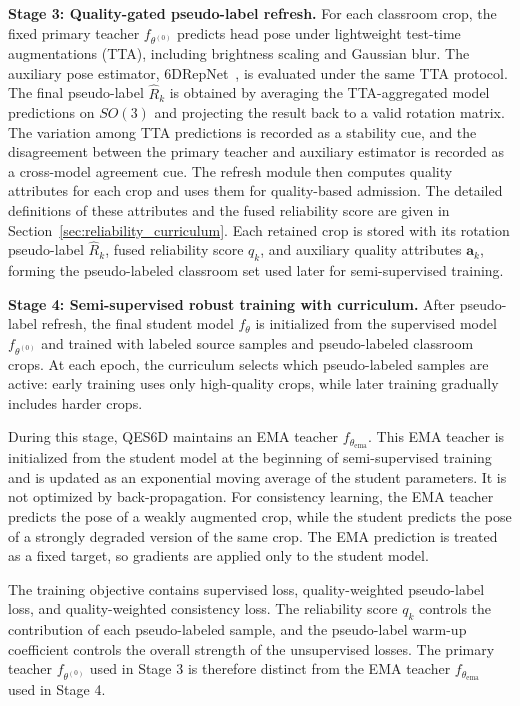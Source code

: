 \documentclass[preprint,12pt]{elsarticle}
\begin{document}
\textbf{Stage 3: Quality-gated pseudo-label refresh.}
For each classroom crop, the fixed primary teacher $f_{\theta^{(0)}}$ predicts head pose under lightweight test-time augmentations (TTA), including brightness scaling and Gaussian blur. The auxiliary pose estimator, 6DRepNet~\cite{hempel2022sixdrepnet}, is evaluated under the same TTA protocol. The final pseudo-label $\hat{R}_k$ is obtained by averaging the TTA-aggregated model predictions on $SO(3)$ and projecting the result back to a valid rotation matrix. The variation among TTA predictions is recorded as a stability cue, and the disagreement between the primary teacher and auxiliary estimator is recorded as a cross-model agreement cue. The refresh module then computes quality attributes for each crop and uses them for quality-based admission. The detailed definitions of these attributes and the fused reliability score are given in Section~\ref{sec:reliability_curriculum}. Each retained crop is stored with its rotation pseudo-label $\hat{R}_k$, fused reliability score $q_k$, and auxiliary quality attributes $\mathbf{a}_k$, forming the pseudo-labeled classroom set used later for semi-supervised training.

\textbf{Stage 4: Semi-supervised robust training with curriculum.}
After pseudo-label refresh, the final student model $f_\theta$ is initialized from the supervised model $f_{\theta^{(0)}}$ and trained with labeled source samples and pseudo-labeled classroom crops. At each epoch, the curriculum selects which pseudo-labeled samples are active: early training uses only high-quality crops, while later training gradually includes harder crops.

During this stage, QES6D maintains an EMA teacher $f_{\theta_{\mathrm{ema}}}$. This EMA teacher is initialized from the student model at the beginning of semi-supervised training and is updated as an exponential moving average of the student parameters. It is not optimized by back-propagation. For consistency learning, the EMA teacher predicts the pose of a weakly augmented crop, while the student predicts the pose of a strongly degraded version of the same crop. The EMA prediction is treated as a fixed target, so gradients are applied only to the student model.

The training objective contains supervised loss, quality-weighted pseudo-label loss, and quality-weighted consistency loss. The reliability score $q_k$ controls the contribution of each pseudo-labeled sample, and the pseudo-label warm-up coefficient controls the overall strength of the unsupervised losses. The primary teacher $f_{\theta^{(0)}}$ used in Stage 3 is therefore distinct from the EMA teacher $f_{\theta_{\mathrm{ema}}}$ used in Stage 4.
\end{document}
